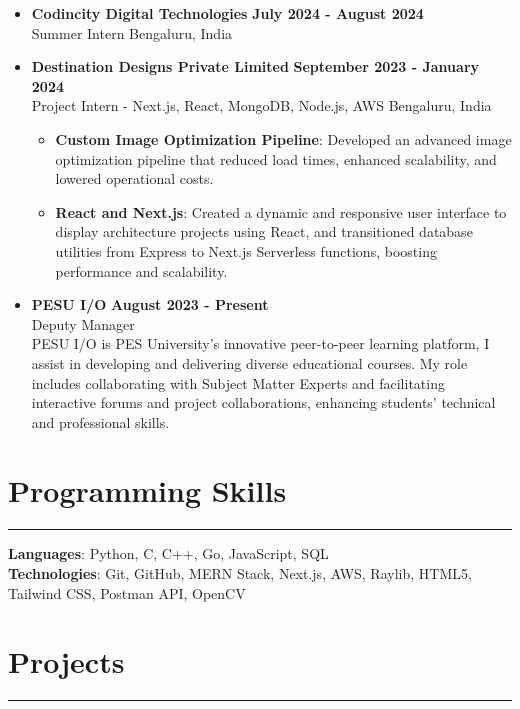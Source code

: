 \documentclass[a4paper,10pt]{article}
\begin{document}
\begin{itemize}
    \item \textbf{Codincity Digital Technologies} \hfill \textbf{July 2024 - August 2024} \\
          Summer Intern \hfill Bengaluru, India
    \item \textbf{Destination Designs Private Limited} \hfill \textbf{September 2023 - January 2024} \\
          Project Intern - Next.js, React, MongoDB, Node.js, AWS \hfill Bengaluru, India
	      \begin{itemize}
		      \item \textbf{Custom Image Optimization Pipeline}: Developed an advanced image optimization pipeline that reduced load times, enhanced scalability, and lowered operational costs.
		      \item \textbf{React and Next.js}: Created a dynamic and responsive user interface to display architecture projects using React, and transitioned database utilities from Express to Next.js Serverless functions, boosting performance and scalability.
	      \end{itemize}
    \item \textbf{PESU I/O} \hfill \textbf{August 2023 - Present} \\ \vspace{0.5em}
    Deputy Manager \\
    PESU I/O is PES University's innovative peer-to-peer learning platform, I assist in developing and delivering diverse educational courses. My role includes collaborating with Subject Matter Experts and facilitating interactive forums and project collaborations, enhancing students' technical and professional skills.
\end{itemize}

\section*{Programming Skills}
\hrule
\vspace{0.5em}

\textbf{Languages}: Python, C, C++, Go, JavaScript, SQL \\
\textbf{Technologies}: Git, GitHub, MERN Stack, Next.js, AWS, Raylib, HTML5, Tailwind CSS, Postman API, OpenCV
\section*{Projects}
\hrule
\vspace{0.5em}
\end{document}
